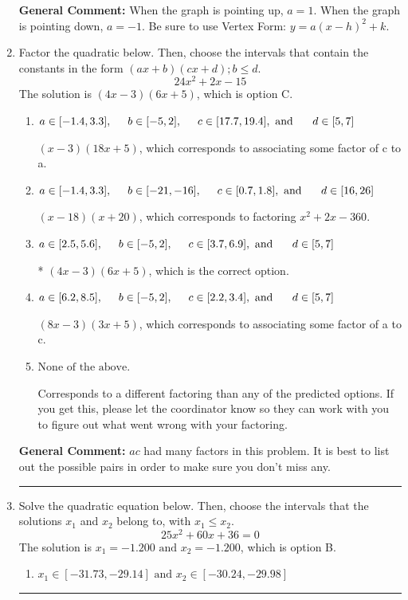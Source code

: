 \documentclass{extbook}[14pt]
\newcommand{\litem}[1]{\item #1

\rule{\textwidth}{0.4pt}}
\begin{document}
\begin{enumerate}
{\textbf{General Comment:} When the graph is pointing up, $a=1$. When the graph is pointing down, $a=-1$. Be sure to use Vertex Form: $y = a(x-h)^2+k$.
}
\litem{
Factor the quadratic below. Then, choose the intervals that contain the constants in the form $(ax+b)(cx+d); b \leq d.$
\[ 24x^{2} +2 x -15 \]The solution is \( (4x -3)(6x + 5) \), which is option C.\begin{enumerate}[label=\Alph*.]
\item \( a \in [-1.4, 3.3], \hspace*{5mm} b \in [-5, 2], \hspace*{5mm} c \in [17.7, 19.4], \text{ and } \hspace*{5mm} d \in [5, 7] \)

 $(x -3)(18x + 5)$, which corresponds to associating some factor of c to a.
\item \( a \in [-1.4, 3.3], \hspace*{5mm} b \in [-21, -16], \hspace*{5mm} c \in [0.7, 1.8], \text{ and } \hspace*{5mm} d \in [16, 26] \)

 $(x -18)(x + 20)$, which corresponds to factoring $x^{2} +2 x -360$.
\item \( a \in [2.5, 5.6], \hspace*{5mm} b \in [-5, 2], \hspace*{5mm} c \in [3.7, 6.9], \text{ and } \hspace*{5mm} d \in [5, 7] \)

* $(4x -3)(6x + 5)$, which is the correct option.
\item \( a \in [6.2, 8.5], \hspace*{5mm} b \in [-5, 2], \hspace*{5mm} c \in [2.2, 3.4], \text{ and } \hspace*{5mm} d \in [5, 7] \)

 $(8x -3)(3x + 5)$, which corresponds to associating some factor of a to c.
\item \( \text{None of the above.} \)

 Corresponds to a different factoring than any of the predicted options. If you get this, please let the coordinator know so they can work with you to figure out what went wrong with your factoring.
\end{enumerate}

\textbf{General Comment:} $ac$ had many factors in this problem. It is best to list out the possible pairs in order to make sure you don't miss any.
}
\litem{
Solve the quadratic equation below. Then, choose the intervals that the solutions $x_1$ and $x_2$ belong to, with $x_1 \leq x_2$.
\[ 25x^{2} +60 x + 36 = 0 \]The solution is \( x_1 = -1.200 \text{ and } x_2 = -1.200 \), which is option B.\begin{enumerate}[label=\Alph*.]
\item \( x_1 \in [-31.73, -29.14] \text{ and } x_2 \in [-30.24, -29.98] \)


\end{enumerate}}
\end{enumerate}
\end{document}

